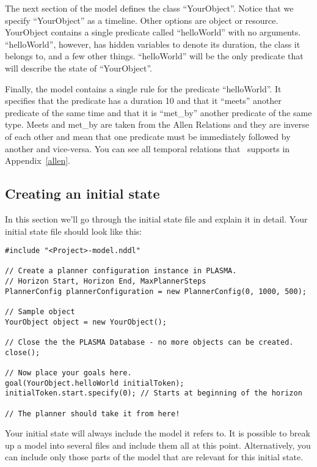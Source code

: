 \documentclass[10pt, letterpaper, twoside]{article}
\begin{document}
The next section of the model defines the class ``YourObject''.  Notice
that we specify ``YourObject'' as a timeline.  Other options are object or
resource.  YourObject contains a single predicate called ``helloWorld''
with no arguments.  ``helloWorld'', however, has hidden variables to
denote its duration, the class it belongs to, and a few other
things. ``helloWorld'' will be the only predicate that will describe the 
state of ``YourObject''.

Finally, the model contains a single rule for the predicate
``helloWorld''.  It specifies that the predicate has a duration 10 and that
it ``meets'' another predicate of the same time and that it is ``met\_by''
another predicate of the same type.  Meets and met\_by are taken from the
Allen Relations \cite{allen} and they are inverse of each other and mean
that one predicate must be immediately followed by another and vice-versa.
You can see all temporal relations that \ET\, supports in Appendix~\ref{allen}.

\subsection{Creating an initial state}
\label{initial}
In this section we'll go through the initial state file and explain it in
detail. Your initial state file should look like this:

\begin{verbatim}
#include "<Project>-model.nddl"

// Create a planner configuration instance in PLASMA.
// Horizon Start, Horizon End, MaxPlannerSteps
PlannerConfig plannerConfiguration = new PlannerConfig(0, 1000, 500);

// Sample object
YourObject object = new YourObject();

// Close the the PLASMA Database - no more objects can be created.
close();

// Now place your goals here.
goal(YourObject.helloWorld initialToken);
initialToken.start.specify(0); // Starts at beginning of the horizon

// The planner should take it from here!
\end{verbatim}

Your initial state will always include the model it refers to.  It is
possible to break up a model into several files and include them all at
this point.  Alternatively, you can include only those parts of the model
that are relevant for this initial state.
\end{document}
